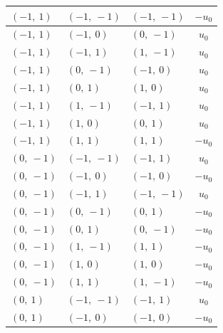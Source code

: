 \documentclass[11pt]{article}
\theoremstyle{definition}
\begin{document}
\begin{longtable}{|l|l|l|c|}
    \hline
    $\left( -1, \  1\right)$ & $\left( -1, \  -1\right)$ & $\left( -1, \  -1\right)$ & $- u_{0}$ \\
    \hline
    $\left( -1, \  1\right)$ & $\left( -1, \  0\right)$ & $\left( 0, \  -1\right)$ & $u_{0}$ \\
    \hline
    $\left( -1, \  1\right)$ & $\left( -1, \  1\right)$ & $\left( 1, \  -1\right)$ & $u_{0}$ \\
    \hline
    $\left( -1, \  1\right)$ & $\left( 0, \  -1\right)$ & $\left( -1, \  0\right)$ & $u_{0}$ \\
    \hline
    $\left( -1, \  1\right)$ & $\left( 0, \  1\right)$ & $\left( 1, \  0\right)$ & $u_{0}$ \\
    \hline
    $\left( -1, \  1\right)$ & $\left( 1, \  -1\right)$ & $\left( -1, \  1\right)$ & $u_{0}$ \\
    \hline
    $\left( -1, \  1\right)$ & $\left( 1, \  0\right)$ & $\left( 0, \  1\right)$ & $u_{0}$ \\
    \hline
    $\left( -1, \  1\right)$ & $\left( 1, \  1\right)$ & $\left( 1, \  1\right)$ & $- u_{0}$ \\
    \hline
    $\left( 0, \  -1\right)$ & $\left( -1, \  -1\right)$ & $\left( -1, \  1\right)$ & $u_{0}$ \\
    \hline
    $\left( 0, \  -1\right)$ & $\left( -1, \  0\right)$ & $\left( -1, \  0\right)$ & $- u_{0}$ \\
    \hline
    $\left( 0, \  -1\right)$ & $\left( -1, \  1\right)$ & $\left( -1, \  -1\right)$ & $u_{0}$ \\
    \hline
    $\left( 0, \  -1\right)$ & $\left( 0, \  -1\right)$ & $\left( 0, \  1\right)$ & $- u_{0}$ \\
    \hline
    $\left( 0, \  -1\right)$ & $\left( 0, \  1\right)$ & $\left( 0, \  -1\right)$ & $- u_{0}$ \\
    \hline
    $\left( 0, \  -1\right)$ & $\left( 1, \  -1\right)$ & $\left( 1, \  1\right)$ & $- u_{0}$ \\
    \hline
    $\left( 0, \  -1\right)$ & $\left( 1, \  0\right)$ & $\left( 1, \  0\right)$ & $- u_{0}$ \\
    \hline
    $\left( 0, \  -1\right)$ & $\left( 1, \  1\right)$ & $\left( 1, \  -1\right)$ & $- u_{0}$ \\
    \hline
    $\left( 0, \  1\right)$ & $\left( -1, \  -1\right)$ & $\left( -1, \  1\right)$ & $u_{0}$ \\
    \hline
    $\left( 0, \  1\right)$ & $\left( -1, \  0\right)$ & $\left( -1, \  0\right)$ & $- u_{0}$ \\

\end{longtable}
\end{document}
